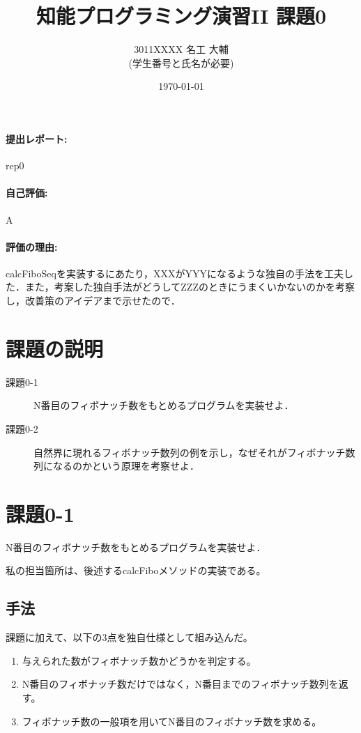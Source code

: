 \documentclass[a4j]{ujarticle}
\title{知能プログラミング演習II 課題0}
\author{
 3011XXXX 名工 大輔\\
  {\small (学生番号と氏名が必要)}
}
\date{\today}
\begin{document}
\maketitle

\paragraph{提出レポート: } rep0
\paragraph{自己評価: } A
\paragraph{評価の理由: } calcFiboSeqを実装するにあたり，XXXがYYYになるような独自の手法を工夫した．また，考案した独自手法がどうしてZZZのときにうまくいかないのかを考察し，改善策のアイデアまで示せたので．



\section{課題の説明}
\begin{description}
\item[課題0-1] N番目のフィボナッチ数をもとめるプログラムを実装せよ．
\item[課題0-2] 自然界に現れるフィボナッチ数列の例を示し，なぜそれがフィボナッチ数列になるのかという原理を考察せよ．
\end{description}


\section{課題0-1}
\begin{screen}
  N番目のフィボナッチ数をもとめるプログラムを実装せよ．
\end{screen}

私の担当箇所は、後述するcalcFiboメソッドの実装である。
\subsection{手法}
課題に加えて、以下の3点を独自仕様として組み込んだ。

\begin{enumerate}
\item 与えられた数がフィボナッチ数かどうかを判定する。
\item N番目のフィボナッチ数だけではなく，N番目までのフィボナッチ数列を返す。
\item フィボナッチ数の一般項を用いてN番目のフィボナッチ数を求める。
\end{enumerate}
\end{document}
